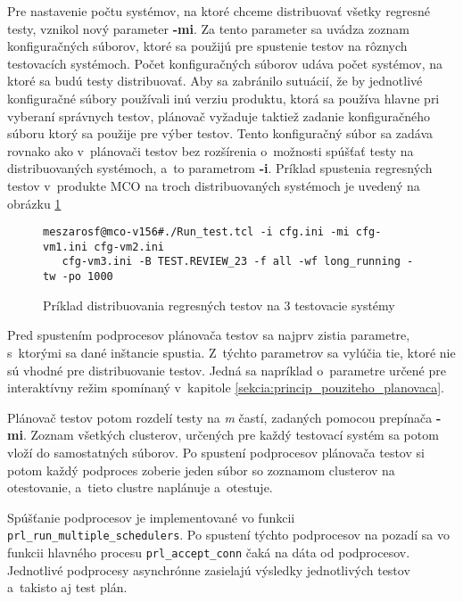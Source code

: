 Pre nastavenie počtu systémov, na ktoré chceme distribuovať všetky regresné testy, vznikol nový parameter \textbf{-mi}.
Za tento parameter sa uvádza zoznam konfiguračných súborov, ktoré sa použijú pre spustenie testov na rôznych
testovacích systémoch. Počet konfiguračných súborov udáva počet systémov, na ktoré sa budú testy distribuovať.
Aby sa zabránilo sutuácií, že by jednotlivé konfiguračné súbory používali inú verziu produktu, ktorá sa
používa hlavne pri vyberaní správnych testov, plánovač vyžaduje taktiež zadanie konfiguračného súboru ktorý
sa použije pre výber testov. Tento konfiguračný súbor sa zadáva rovnako ako v~plánovači testov bez rozšírenia
o~možnosti spúšťať testy na distribuovaných systémoch, a~to parametrom \textbf{-i}.
Príklad spustenia regresných testov v~produkte MCO na troch distribuovaných systémoch je uvedený na obrázku 
\ref{obrazok:priklad_spustania_testov_paralelne}

\begin{figure}[h]
\begin{lstlisting}
meszarosf@mco-v156#./Run_test.tcl -i cfg.ini -mi cfg-vm1.ini cfg-vm2.ini 
   cfg-vm3.ini -B TEST.REVIEW_23 -f all -wf long_running -tw -po 1000
\end{lstlisting}
\caption{Príklad distribuovania regresných testov na 3 testovacie systémy}
\label{obrazok:priklad_spustania_testov_paralelne}
\end{figure}

Pred spustením podprocesov plánovača testov sa najprv zistia parametre, s~ktorými sa dané 
inštancie spustia. Z~týchto parametrov sa vylúčia tie, ktoré nie sú vhodné pre
distribuovanie testov. Jedná sa napríklad o~parametre určené pre interaktívny režim spomínaný v~kapitole 
\ref{sekcia:princip_pouziteho_planovaca}.

Plánovač testov potom rozdelí testy na \textit{m} častí, zadaných pomocou prepínača \textbf{-mi}.
Zoznam všetkých clusterov, určených pre každý testovací systém sa potom vloží do samostatných súborov.
Po spustení podprocesov plánovača testov si potom každý podproces zoberie jeden súbor so zoznamom 
clusterov na otestovanie, a~tieto clustre naplánuje a~otestuje.

Spúšťanie podprocesov je implementované vo funkcii \texttt{prl\_run\_multiple\_schedulers}.
Po spustení týchto podprocesov na pozadí sa vo funkcii hlavného procesu \texttt{prl\_accept\_conn} čaká na dáta od podprocesov.
Jednotlivé podprocesy asynchrónne zasielajú výsledky jednotlivých testov a~takisto aj test plán.

